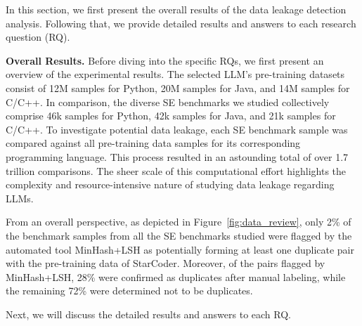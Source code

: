 
In this section, we first present the overall results of the data leakage detection analysis. Following that, we provide detailed results and answers to each research question (RQ).



\vspace{0.2cm}
\noindent
\textbf{Overall Results.}
Before diving into the specific RQs, we first present an overview of the experimental results. The selected LLM's pre-training datasets consist of 12M samples for Python, 20M samples for Java, and 14M samples for C/C++. In comparison, the diverse SE benchmarks we studied collectively comprise 46k samples for Python, 42k samples for Java, and 21k samples for C/C++.
To investigate potential data leakage, each SE benchmark sample was compared against all pre-training data samples for its corresponding programming language. This process resulted in an astounding total of over 1.7 trillion comparisons. The sheer scale of this computational effort highlights the complexity and resource-intensive nature of studying data leakage regarding LLMs. 


From an overall perspective, as depicted in Figure~\ref{fig:data_review}, only 2\% of the benchmark samples from all the SE benchmarks studied were flagged by the automated tool MinHash+LSH as potentially forming at least one duplicate pair with the pre-training data of StarCoder. Moreover, of the pairs flagged by MinHash+LSH, 28\% were confirmed as duplicates after manual labeling, while the remaining 72\% were determined not to be duplicates.

Next, we will discuss the detailed results and answers to each RQ.








